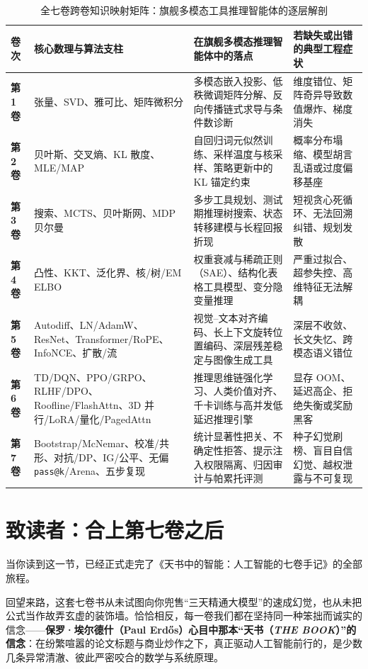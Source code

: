 \begin{table}[htbp]
  \centering
  \caption{全七卷跨卷知识映射矩阵：旗舰多模态工具推理智能体的逐层解剖}
  \label{tab:seven-vol-matrix}
  \footnotesize
  \begin{tabularx}{\linewidth}{@{}p{13mm}p{36mm}p{51mm}X@{}}
    \toprule
    \textbf{卷次} & \textbf{核心数理与算法支柱} & \textbf{在旗舰多模态推理智能体中的落点} & \textbf{若缺失或出错的典型工程症状} \\
    \midrule
    \textbf{第 1 卷} & 张量、SVD、雅可比、矩阵微积分 & 多模态嵌入投影、低秩微调矩阵分解、反向传播链式求导与条件数诊断 & 维度错位、矩阵奇异导致数值爆炸、梯度消失 \\
    \textbf{第 2 卷} & 贝叶斯、交叉熵、KL 散度、MLE/MAP & 自回归词元似然训练、采样温度与核采样、策略更新中的 KL 锚定约束 & 概率分布塌缩、模型胡言乱语或过度偏移基座 \\
    \textbf{第 3 卷} & 搜索、MCTS、贝叶斯网、MDP 贝尔曼 & 多步工具规划、测试期推理树搜索、状态转移建模与长程回报折现 & 短视贪心死循环、无法回溯纠错、规划发散 \\
    \textbf{第 4 卷} & 凸性、KKT、泛化界、核/树/EM ELBO & 权重衰减与稀疏正则（SAE）、结构化表格工具模型、变分隐变量推理 & 严重过拟合、超参失控、高维特征无法解耦 \\
    \textbf{第 5 卷} & Autodiff、LN/AdamW、ResNet、Transformer/RoPE、InfoNCE、扩散/流 & 视觉--文本对齐编码、长上下文旋转位置编码、深层残差稳定与图像生成工具 & 深层不收敛、长文失忆、跨模态语义错位 \\
    \textbf{第 6 卷} & TD/DQN、PPO/GRPO、RLHF/DPO、Roofline/FlashAttn、3D 并行/LoRA/量化/PagedAttn & 推理思维链强化学习、人类价值对齐、千卡训练与高并发低延迟推理引擎 & 显存 OOM、延迟高企、拒绝失衡或奖励黑客 \\
    \textbf{第 7 卷} & Bootstrap/McNemar、校准/共形、对抗/DP、IG/公平、无偏 \texttt{pass@k}/Arena、五步复现 & 统计显著性把关、不确定性拒答、提示注入权限隔离、归因审计与帕累托评测 & 种子幻觉刷榜、盲目自信幻觉、越权泄露与不可复现 \\
    \bottomrule
  \end{tabularx}
\end{table}

\section{致读者：合上第七卷之后}

当你读到这一节，已经正式走完了《天书中的智能：人工智能的七卷手记》的全部旅程。

回望来路，这套七卷书从未试图向你兜售“三天精通大模型”的速成幻觉，也从未把公式当作故弄玄虚的装饰墙。恰恰相反，每一卷我们都在坚持同一种笨拙而诚实的信念——\textbf{保罗·埃尔德什（Paul Erdős）心目中那本“天书（\emph{THE BOOK}）”的信念}：在纷繁喧嚣的论文标题与商业炒作之下，真正驱动人工智能前行的，是少数几条异常清澈、彼此严密咬合的数学与系统原理。

